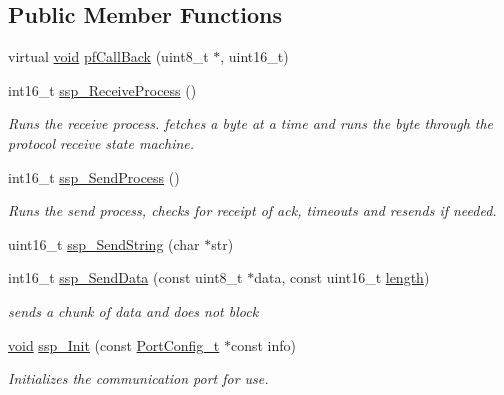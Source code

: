 \subsection*{\-Public \-Member \-Functions}
\begin{DoxyCompactItemize}
\item 
virtual \hyperlink{group___u_a_v_objects_plugin_ga444cf2ff3f0ecbe028adce838d373f5c}{void} \hyperlink{group___uploader_ga78a7ba52d304ce0352e013e99e98820d}{pf\-Call\-Back} (uint8\-\_\-t $\ast$, uint16\-\_\-t)
\item 
int16\-\_\-t \hyperlink{group___uploader_ga11e7402dcc0d8efde83d13592279f122}{ssp\-\_\-\-Receive\-Process} ()
\begin{DoxyCompactList}\small\item\em \-Runs the receive process. fetches a byte at a time and runs the byte through the protocol receive state machine. \end{DoxyCompactList}\item 
int16\-\_\-t \hyperlink{group___uploader_gaa1b44e385ddf057c81585809dc71e4ba}{ssp\-\_\-\-Send\-Process} ()
\begin{DoxyCompactList}\small\item\em \-Runs the send process, checks for receipt of ack, timeouts and resends if needed. \end{DoxyCompactList}\item 
uint16\-\_\-t \hyperlink{group___uploader_ga53a085c64c9a0e54a10cefe2ce660714}{ssp\-\_\-\-Send\-String} (char $\ast$str)
\item 
int16\-\_\-t \hyperlink{group___uploader_gae129d1cdf9ba386b6cd8002176a35a3b}{ssp\-\_\-\-Send\-Data} (const uint8\-\_\-t $\ast$data, const uint16\-\_\-t \hyperlink{uavobjecttemplate_8m_a076bf56c9bafa07f3dbda4901a40d84c}{length})
\begin{DoxyCompactList}\small\item\em sends a chunk of data and does not block \end{DoxyCompactList}\item 
\hyperlink{group___u_a_v_objects_plugin_ga444cf2ff3f0ecbe028adce838d373f5c}{void} \hyperlink{group___uploader_gaa7efad31d36502cca3aab3e4eed10d12}{ssp\-\_\-\-Init} (const \hyperlink{struct_port_config__t}{\-Port\-Config\-\_\-t} $\ast$const info)
\begin{DoxyCompactList}\small\item\em \-Initializes the communication port for use. \end{DoxyCompactList}\item 

\end{DoxyCompactItemize}
